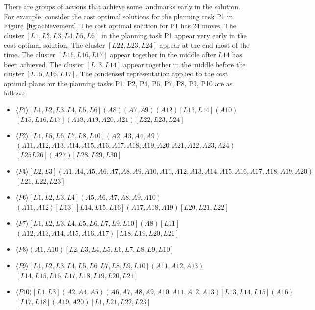 There are groups of actions that achieve some landmarks early in the solution.
For example, consider the cost optimal solutions for the planning task P1 in Figure~\ref{fig:achievement}.
The cost optimal solution for P1 has 24 moves.
The cluster $[L1, L2, L3, L4, L5, L6]$ in the planning task P1 appear very early in the cost optimal solution.
The cluster $[L22, L23, L24]$ appear at the end most of the time.
The cluster $[L15, L16, L17]$ appear together in the middle after $L14$ has been achieved.
The cluster $[L13, L14]$ appear together in the middle before  the cluster $[L15, L16, L17]$.
The condensed representation applied to the cost optimal plans for the planning tasks P1, P2, P4, P6, P7, P8, P9, P10 are as follows:
\begin{itemize}
\item $\langle P1\rangle [L1, L2, L3, L4, L5, L6] (A8) (A7,A9) (A12) [L13, L14] (A10)$ \\ $[L15, L16, L17] (A18, A19, A20, A21) [L22, L23, L24]$
\item  $\langle P2\rangle [L1, L5, L6, L7, L8, L10] (A2, A3, A4, A9)$ \\ $(A11, A12, A13, A14, A15, A16, A17, A18, A19, A20, A21, A22, A23, A24)$ \\ $[L25 L26](A27)[L28, L29, L30]$
\item  $\langle P4\rangle [L2, L3](A1, A4, A5, A6, A7, A8, A9, A10, A11, A12, A13, A14, A15, A16, A17, A18, A19, A20)$\\$[L21, L22, L23]$
\item  $\langle P6\rangle [L1, L2,L3,L4](A5, A6, A7, A8, A9, A10)$ \\ $(A11,A12) [L13][L14, L15, L16](A17,A18,A19)[L20, L21, L22]$
\item  $\langle P7\rangle [L1, L2,L3,L4,L5,L6,L7,L9,L10](A8)[L11]$ \\ $(A12, A13, A14, A15, A16, A17)[L18,L19,L20,L21]$
\item  $\langle P8\rangle (A1,A10) [L2,L3,L4,L5,L6,L7,L8,L9,L10]$
\item  $\langle P9\rangle [L1,L2,L3,L4,L5,L6,L7,L8,L9,L10](A11, A12, A13)$\\$[L14,L15,L16,L17,L18,L19,L20,L21]$
\item  $\langle P10\rangle [L1,L3] (A2,A4,A5) (A6,A7,A8,A9,A10,A11,A12,A13) [L13,L14,L15](A16)$ \\ $[L17,L18] (A19,A20) [L1,L21,L22,L23]$
\end{itemize}

